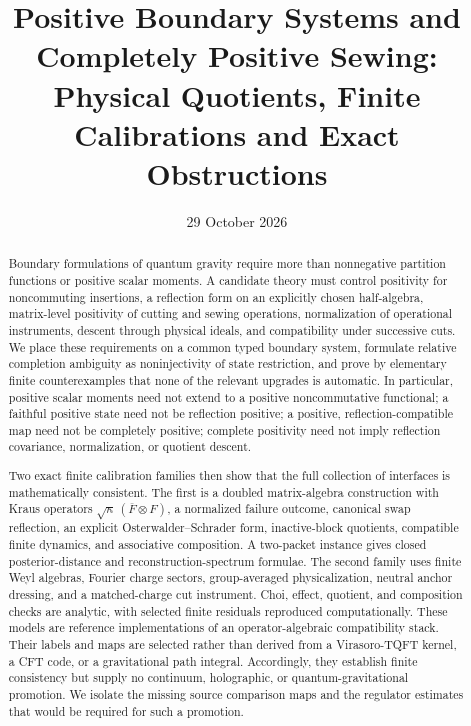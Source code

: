 \documentclass[11pt,a4paper]{article}
\title{\bfseries Positive Boundary Systems and Completely Positive Sewing:\\
Physical Quotients, Finite Calibrations and Exact Obstructions}
\author{}
\date{29 October 2026}
\theoremstyle{definition}
\theoremstyle{remark}
\begin{document}
\maketitle

\begin{abstract}
Boundary formulations of quantum gravity require more than nonnegative partition
functions or positive scalar moments.  A candidate theory must control positivity for
noncommuting insertions, a reflection form on an explicitly chosen half-algebra,
matrix-level positivity of cutting and sewing operations, normalization of operational
instruments, descent through physical ideals, and compatibility under successive cuts.
We place these requirements on a common typed boundary system, formulate relative
completion ambiguity as noninjectivity of state restriction, and prove by elementary finite
counterexamples that none of the relevant upgrades is automatic.  In particular,
positive scalar moments need not extend to a positive noncommutative functional; a
faithful positive state need not be reflection positive; a positive,
reflection-compatible map need not be completely positive; complete positivity need
not imply reflection covariance, normalization, or quotient descent.

Two exact finite calibration families then show that the full collection of interfaces
is mathematically consistent.  The first is a doubled matrix-algebra construction with
Kraus operators $\sqrt{\kappa}\,(\overline F\otimes F)$, a normalized failure outcome,
canonical swap reflection, an explicit Osterwalder--Schrader form, inactive-block
quotients, compatible finite dynamics, and associative composition.  A two-packet
instance gives closed posterior-distance and reconstruction-spectrum formulae.  The
second family uses finite Weyl algebras, Fourier charge sectors, group-averaged
physicalization, neutral anchor dressing, and a matched-charge cut instrument.  Choi,
effect, quotient, and composition checks are analytic, with selected finite residuals
reproduced computationally.  These models are reference implementations of an
operator-algebraic compatibility stack.  Their labels and maps are selected rather
than derived from a Virasoro-TQFT kernel, a CFT code, or a gravitational path integral.
Accordingly, they establish finite consistency but supply no continuum, holographic,
or quantum-gravitational promotion.  We isolate the missing source comparison maps and
the regulator estimates that would be required for such a promotion.
\end{abstract}
\end{document}
